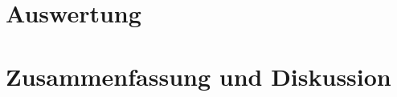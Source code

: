 \documentclass[ngerman]{scrartcl}
\begin{document}
\section{Auswertung}
\label{sec:auswertung}



\section{Zusammenfassung und Diskussion}
\label{sec:zusammenfassung_diskussion}



\label{sec:python}





\clearpage
\printbibliography

\listoffigures

\listoftables
\end{document}

